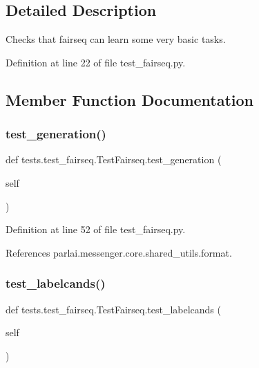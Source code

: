 \subsection{Detailed Description}
\begin{DoxyVerb}Checks that fairseq can learn some very basic tasks.\end{DoxyVerb}
 

Definition at line 22 of file test\+\_\+fairseq.\+py.



\subsection{Member Function Documentation}
\mbox{\label{classtests_1_1test__fairseq_1_1TestFairseq_aebd6e9deb59f248a1e1f7aff8443447a}} 
\subsubsection{\texorpdfstring{test\+\_\+generation()}{test\_generation()}}
{\footnotesize\ttfamily def tests.\+test\+\_\+fairseq.\+Test\+Fairseq.\+test\+\_\+generation (\begin{DoxyParamCaption}\item[{}]{self }\end{DoxyParamCaption})}



Definition at line 52 of file test\+\_\+fairseq.\+py.



References parlai.\+messenger.\+core.\+shared\+\_\+utils.\+format.

\mbox{\label{classtests_1_1test__fairseq_1_1TestFairseq_a59b33ca3a07d16dbfe630c806d6c9aa3}} 
\subsubsection{\texorpdfstring{test\+\_\+labelcands()}{test\_labelcands()}}
{\footnotesize\ttfamily def tests.\+test\+\_\+fairseq.\+Test\+Fairseq.\+test\+\_\+labelcands (\begin{DoxyParamCaption}\item[{}]{self }\end{DoxyParamCaption})}



